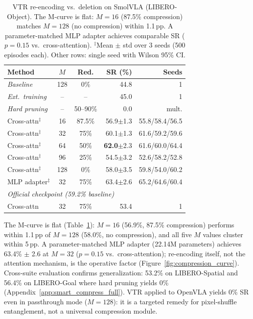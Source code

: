 \begin{table}[t]
\centering
\small
\caption{VTR re-encoding vs.\ deletion on SmolVLA (LIBERO-Object). The M-curve is flat: $M{=}16$ (87.5\% compression) matches $M{=}128$ (no compression) within 1.1\,pp. A parameter-matched MLP adapter achieves comparable SR ($p = 0.15$ vs.\ cross-attention). $^\ddagger$Mean $\pm$ std over 3 seeds (500 episodes each). Other rows: single seed with Wilson 95\% CI.}
\label{tab:smart_compress}
\begin{tabular}{lccrr}
\toprule
Method & $M$ & Red. & SR (\%) & Seeds \\
\midrule
\textit{Baseline} & 128 & 0\% & 44.8 & 1 \\
\textit{Ext.\ training} & -- & -- & 45.0 & 1 \\
\textit{Hard pruning} & -- & 50--90\% & 0.0 & mult. \\
\midrule
Cross-attn$^\ddagger$ & 16 & 87.5\% & 56.9$\pm$1.3 & 55.8/58.4/56.5 \\
Cross-attn$^\ddagger$ & 32 & 75\% & 60.1$\pm$1.3 & 61.6/59.2/59.6 \\
Cross-attn$^\ddagger$ & 64 & 50\% & \textbf{62.0}$\pm$2.3 & 61.6/60.0/64.4 \\
Cross-attn$^\ddagger$ & 96 & 25\% & 54.5$\pm$3.2 & 52.6/58.2/52.8 \\
Cross-attn$^\ddagger$ & 128 & 0\% & 58.0$\pm$3.5 & 59.8/54.0/60.2 \\
MLP adapter$^\ddagger$ & 32 & 75\% & 63.4$\pm$2.6 & 65.2/64.6/60.4 \\
\midrule
\multicolumn{5}{l}{\textit{Official checkpoint (59.2\% baseline)}} \\
Cross-attn & 32 & 75\% & 53.4 & 1 \\
\bottomrule
\end{tabular}
\end{table}

The M-curve is flat (Table~\ref{tab:smart_compress}): $M{=}16$ (56.9\%, 87.5\% compression) performs within 1.1\,pp of $M{=}128$ (58.0\%, no compression), and all five $M$ values cluster within 5\,pp. A parameter-matched MLP adapter (22.14M parameters) achieves 63.4\% $\pm$ 2.6 at $M{=}32$ ($p = 0.15$ vs.\ cross-attention); re-encoding itself, not the attention mechanism, is the operative factor (Figure~\ref{fig:compression_curve}). Cross-suite evaluation confirms generalization: 53.2\% on LIBERO-Spatial and 56.4\% on LIBERO-Goal where hard pruning yields 0\% (Appendix~\ref{app:smart_compress_full}). VTR applied to OpenVLA yields 0\% SR even in passthrough mode ($M{=}128$): it is a targeted remedy for pixel-shuffle entanglement, not a universal compression module.

